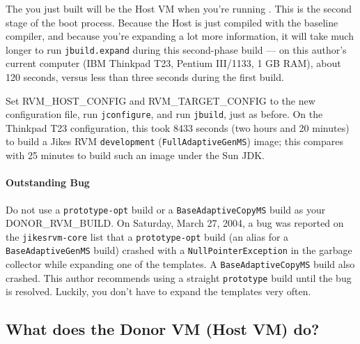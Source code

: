 
The \jrvm{} you just built will be the Host VM when you're running
\gft{}.  This is the second stage of the boot process.  Because the
Host \jrvm{} is just compiled with the baseline compiler, and because
you're expanding a lot more information, it will take much longer to
run \texttt{jbuild.expand} during this second-phase build --- on this
author's current computer (IBM Thinkpad T23, Pentium III/1133, 1 GB
RAM), about 120 seconds, versus less than three seconds during the first build.


Set RVM\_HOST\_CONFIG and RVM\_TARGET\_CONFIG to the new configuration
file, run \texttt{jconfigure}, and run \texttt{jbuild}, just as
before.   On the Thinkpad T23 configuration, this took 8433 seconds (two
hours and 20 minutes) to build a Jikes RVM \texttt{development}
(\texttt{FullAdaptiveGenMS}) image; this compares with 25 minutes to
build such an image under the Sun JDK.

\paragraph{Outstanding Bug} Do not use a {\tt prototype-opt} build or
a \texttt{BaseAdaptiveCopyMS} build as
your DONOR\_RVM\_BUILD.  On Saturday, March 27, 2004, a bug
was reported on the \texttt{jikesrvm-core} list that a
\texttt{prototype-opt} build (an alias for a
\texttt{BaseAdaptiveGenMS} build) crashed with a
\texttt{NullPointerException} in the garbage collector while expanding
one of the templates.  A \texttt{BaseAdaptiveCopyMS} build also
crashed.  This author recommends using a straight \texttt{prototype} build
until the bug is resolved.  Luckily, you don't have to expand the
templates very often.


\subsection{What does the Donor VM (Host VM) do?}%
%
%


